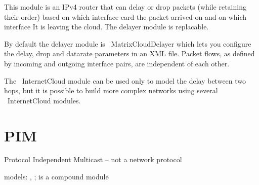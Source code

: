This module is an IPv4 router that can delay or drop packets (while retaining
their order) based on which interface card the packet arrived on and 
on which interface It is leaving the cloud. The delayer module is replacable.

By default the delayer module is ~MatrixCloudDelayer which lets you configure
the delay, drop and datarate parameters in an XML file. Packet flows, as defined
by incoming and outgoing interface pairs, are independent of each other.

The ~InternetCloud module can be used only to model the delay between two hops, but
it is possible to build more complex networks using several ~InternetCloud modules.

\section{PIM}
\label{sec:networkprotocols:pim}

Protocol Independent Multicast -- not a network protocol

models: , ;  is a compound module




